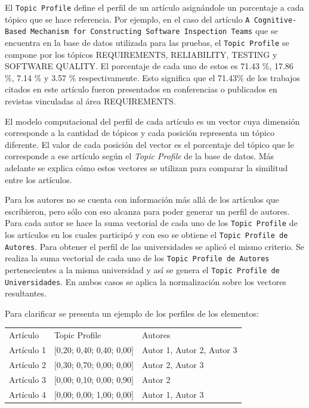 El \texttt{Topic Profile} define el perfil de un artículo asignándole un porcentaje a cada tópico que se hace referencia. Por ejemplo, en el caso del artículo \texttt{A Cognitive-Based Mechanism for Constructing Software Inspection Teams} que se encuentra en la base de datos utilizada para las pruebas, el \texttt{Topic Profile} se compone por los tópicos  REQUIREMENTS, RELIABILITY, TESTING y SOFTWARE QUALITY. El porcentaje de cada uno de estos es 71.43 \%, 17.86 \%, 7.14 \% y 3.57 \% respectivamente. Esto significa que el 71.43\% de los trabajos citados en este artículo fueron presentados en conferencias o publicados en revistas vinculadas al área REQUIREMENTS.

El modelo computacional del perfil de cada artículo es un vector cuya dimensión corresponde a la cantidad de tópicos y cada posición representa un tópico diferente. El valor de cada posición del vector es el porcentaje del tópico que le corresponde a ese artículo según el \textit{Topic Profile} de la base de datos. Más adelante se explica cómo estos vectores se utilizan para comparar la similitud entre los artículos.

Para los autores no se cuenta con información más allá de los artículos que escribieron, pero sólo con eso alcanza para poder generar un perfil de autores. Para cada autor se hace la suma vectorial de cada uno de los \texttt{Topic Profile} de los artículos en los cuales participó y con eso se obtiene el \texttt{Topic Profile de Autores}. Para obtener el perfil de las universidades se aplicó el mismo criterio. Se realiza la suma vectorial de cada uno de los \texttt{Topic Profile de Autores} pertenecientes a la misma universidad y así se genera el \texttt{Topic Profile de Universidades}. En ambos casos se aplica la normalización sobre los vectores resultantes.

Para clarificar se presenta un ejemplo de los perfiles de los elementos:

\begin{table}[H]
\begin{tabular}{lll}
	Artículo & Topic Profile & Autores \\
	Artículo 1 & $[$0,20; 0,40; 0,40; 0,00$]$ & Autor 1, Autor 2, Autor 3 \\
	Artículo 2 & $[$0,30; 0,70; 0,00; 0,00$]$ & Autor 2, Autor 3 \\
	Artículo 3 & $[$0,00; 0,10; 0,00; 0,90$]$ & Autor 2 \\
	Artículo 4 & $[$0,00; 0,00; 1,00; 0,00$]$ & Autor 1, Autor 3 \\
\end{tabular}
\label{tabla:topicProfileEj1}
\end{table}

